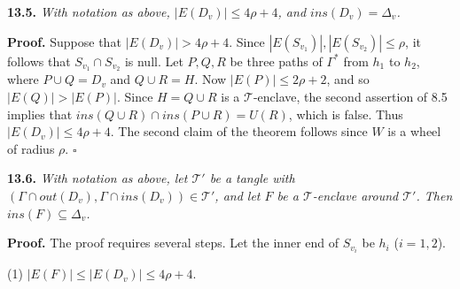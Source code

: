 \textbf{13.5.} \textit{With notation as above, $|E(D_v)| \le 4\rho + 4$, and $ins(D_v) = \Delta_v$.}

\textbf{Proof.} Suppose that $|E(D_v)| > 4\rho + 4$. Since $|E(S_{v_1})|, |E(S_{v_2})| \le \rho$, it follows that $S_{v_1} \cap S_{v_2}$ is null. Let $P, Q, R$ be three paths of $\Gamma^*$ from $h_1$ to $h_2$, where $P \cup Q = D_v$ and $Q \cup R = H$. Now $|E(P)| \le 2\rho + 2$, and so $|E(Q)| > |E(P)|$. Since $H = Q \cup R$ is a $\mathscr{T}$-enclave, the second assertion of 8.5 implies that $ins(Q \cup R) \cap ins(P \cup R) = U(R)$, which is false. Thus $|E(D_v)| \le 4\rho + 4$. The second claim of the theorem follows since $W$ is a wheel of radius $\rho$. $\square$

\textbf{13.6.} \textit{With notation as above, let $\mathscr{T}'$ be a tangle with $(\Gamma \cap out(D_v), \Gamma \cap ins(D_v)) \in \mathscr{T}'$, and let $F$ be a $\mathscr{T}$-enclave around $\mathscr{T}'$. Then $ins(F) \subseteq \Delta_v$.}

\textbf{Proof.} The proof requires several steps. Let the inner end of $S_{v_i}$ be $h_i$ ($i = 1, 2$).

\hspace*{12pt}(1) $|E(F)| \le |E(D_v)| \le 4\rho + 4$.
